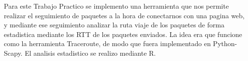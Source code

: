 Para este Trabajo Practico se implemento una herramienta que nos permite realizar el seguimiento de paquetes a la hora de conectarnos con una pagina web, y mediante ese seguimiento analizar la ruta viaje de los paquetes de forma estadistica mediante los RTT de los paquetes enviados. La idea era que funcione como la herramienta Traceroute, de modo que fuera implementado en Python-Scapy. El analisis estadistico se realizo mediante R.
